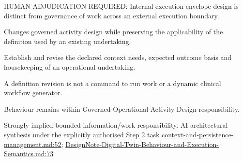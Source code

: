 HUMAN ADJUDICATION REQUIRED: Internal execution-envelope design is distinct from governance of work across an external execution boundary.



Changes governed activity design while preserving the applicability of the definition used by an existing undertaking.



Establish and revise the declared context needs, expected outcome basis and housekeeping of an operational undertaking.



A definition revision is not a command to run work or a dynamic clinical workflow generator.



Behaviour remains within Governed Operational Activity Design responsibility.


Strongly implied bounded information/work responsibility. AI architectural synthesis under the explicitly authorised Step 2 task \hyperref[evidence:ea0c62dfd5edfd4a]{context-and-persistence-management.md:52}; \hyperref[evidence:ec6250f7cf7c29a5]{DesignNote-Digital-Twin-Behaviour-and-Execution-Semantics.md:73}
